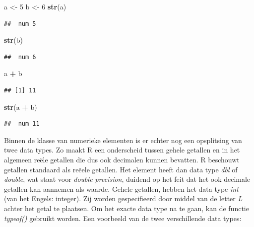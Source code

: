 \documentclass[
]{book}
\newenvironment{Shaded}{\begin{snugshade}}{\end{snugshade}}
\newcommand{\DecValTok}[1]{\textcolor[rgb]{0.00,0.00,0.81}{#1}}
\newcommand{\FunctionTok}[1]{\textcolor[rgb]{0.13,0.29,0.53}{\textbf{#1}}}
\newcommand{\NormalTok}[1]{#1}
\newcommand{\OtherTok}[1]{\textcolor[rgb]{0.56,0.35,0.01}{#1}}
\newcommand{\SpecialCharTok}[1]{\textcolor[rgb]{0.81,0.36,0.00}{\textbf{#1}}}
\begin{document}
\begin{Shaded}
\begin{Highlighting}[]
\NormalTok{a }\OtherTok{\textless{}{-}} \DecValTok{5}
\NormalTok{b }\OtherTok{\textless{}{-}} \DecValTok{6}
\FunctionTok{str}\NormalTok{(a)}
\end{Highlighting}
\end{Shaded}

\begin{verbatim}
##  num 5
\end{verbatim}

\begin{Shaded}
\begin{Highlighting}[]
\FunctionTok{str}\NormalTok{(b)}
\end{Highlighting}
\end{Shaded}

\begin{verbatim}
##  num 6
\end{verbatim}

\begin{Shaded}
\begin{Highlighting}[]
\NormalTok{a }\SpecialCharTok{+}\NormalTok{ b }
\end{Highlighting}
\end{Shaded}

\begin{verbatim}
## [1] 11
\end{verbatim}

\begin{Shaded}
\begin{Highlighting}[]
\FunctionTok{str}\NormalTok{(a }\SpecialCharTok{+}\NormalTok{ b)}
\end{Highlighting}
\end{Shaded}

\begin{verbatim}
##  num 11
\end{verbatim}

Binnen de klasse van numerieke elementen is er echter nog een opsplitsing van twee data types. Zo maakt R een onderscheid tussen gehele getallen en in het algemeen reële getallen die dus ook decimalen kunnen bevatten. R beschouwt getallen standaard als reëele getallen. Het element heeft dan data type \emph{dbl} of \emph{double}, wat staat voor \emph{double precision}, duidend op het feit dat het ook decimale getallen kan aannemen als waarde. Gehele getallen, hebben het data type \emph{int} (van het Engels: integer). Zij worden gespecifieerd door middel van de letter \emph{L} achter het getal te plaatsen. Om het exacte data type na te gaan, kan de functie \emph{typeof()} gebruikt worden. Een voorbeeld van de twee verschillende data types:
\end{document}
